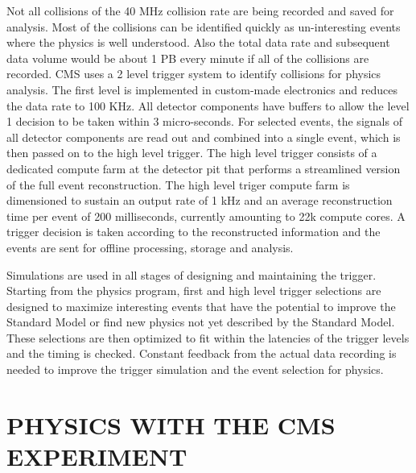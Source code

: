 \documentclass{wscpaperproc}
\theoremstyle{wsc}
\begin{document}
Not all collisions of the 40 MHz collision rate are being recorded and saved for analysis. Most of the collisions can be identified quickly as un-interesting events where the physics is well understood. Also the total data rate and subsequent data volume would be about 1 PB every minute if all of the collisions are recorded. CMS uses a 2 level trigger system to identify collisions for physics analysis. The first level is implemented in custom-made electronics and reduces the data rate to 100 KHz. All detector components have buffers to allow the level 1 decision to be taken within 3 micro-seconds. For selected events, the signals of all detector components are read out and combined into a single event, which is then passed on to the high level trigger. The high level trigger consists of a dedicated compute farm at the detector pit that performs a streamlined version of the full event reconstruction. The high level triger compute farm is dimensioned to sustain an output rate of 1 kHz and an average reconstruction time per event of 200 milliseconds, currently amounting to 22k compute cores. A trigger decision is taken according to the reconstructed information and the events are sent for offline processing, storage and analysis.

Simulations are used in all stages of designing and maintaining the trigger. Starting from the physics program, first and high level trigger selections are designed to maximize interesting events that have the potential to improve the Standard Model or find new physics not yet described by the Standard Model. These selections are then optimized to fit within the latencies of the trigger levels and the timing is checked. Constant feedback from the actual data recording is needed to improve the trigger simulation and the event selection for physics.

\section{PHYSICS WITH THE CMS EXPERIMENT}
\label{sec:physics}
\end{document}
